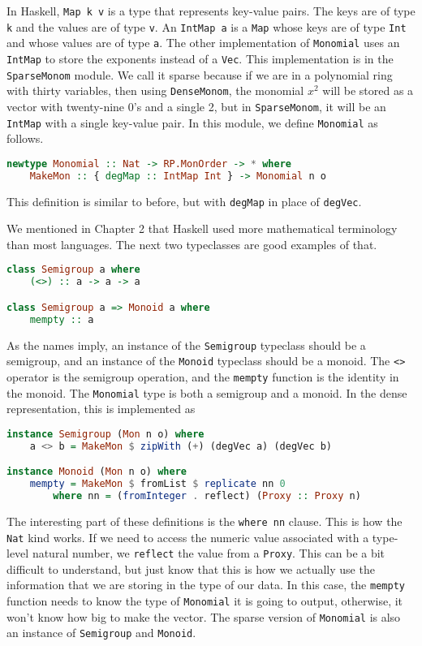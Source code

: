 \documentclass[MS, xcolor=dvipsnames]{wfuthesis}
\theoremstyle{definition}
\begin{document}
In Haskell, \lstinline{Map k v} is a type that represents key-value pairs. The keys are of type \lstinline{k} and the values are of type \lstinline{v}. An \lstinline{IntMap a} is a \lstinline{Map} whose keys are of type \lstinline{Int} and whose values are of type \lstinline{a}. The other implementation of \lstinline{Monomial} uses an \lstinline{IntMap} to store the exponents instead of a \lstinline{Vec}. This implementation is in the \lstinline{SparseMonom} module. We call it sparse because if we are in a polynomial ring with thirty variables, then using \lstinline{DenseMonom}, the monomial $x^2$ will be stored as a vector with twenty-nine 0's and a single 2, but in \lstinline{SparseMonom}, it will be an \lstinline{IntMap} with a single key-value pair. In this module, we define \lstinline{Monomial} as follows.
\begin{lstlisting}[language=Haskell]
newtype Monomial :: Nat -> RP.MonOrder -> * where
    MakeMon :: { degMap :: IntMap Int } -> Monomial n o
\end{lstlisting}
This definition is similar to before, but with \lstinline{degMap} in place of \lstinline{degVec}. \par
We mentioned in Chapter 2 that Haskell used more mathematical terminology than most languages. The next two typeclasses are good examples of that.
\begin{lstlisting}[language=Haskell]
class Semigroup a where
    (<>) :: a -> a -> a

class Semigroup a => Monoid a where
    mempty :: a
\end{lstlisting}
As the names imply, an instance of the \lstinline{Semigroup} typeclass should be a semigroup, and an instance of the \lstinline{Monoid} typeclass should be a monoid. The \lstinline{<>} operator is the semigroup operation, and the \lstinline{mempty} function is the identity in the monoid. The \lstinline{Monomial} type is both a semigroup and a monoid. In the dense representation, this is implemented as
\begin{lstlisting}[language=Haskell]
instance Semigroup (Mon n o) where
    a <> b = MakeMon $ zipWith (+) (degVec a) (degVec b)

instance Monoid (Mon n o) where
    mempty = MakeMon $ fromList $ replicate nn 0
        where nn = (fromInteger . reflect) (Proxy :: Proxy n)
\end{lstlisting}
The interesting part of these definitions is the \lstinline{where nn} clause. This is how the \lstinline{Nat} kind works. If we need to access the numeric value associated with a type-level natural number, we \lstinline{reflect} the value from a \lstinline{Proxy}. This can be a bit difficult to understand, but just know that this is how we actually use the information that we are storing in the type of our data. In this case, the \lstinline{mempty} function needs to know the type of \lstinline{Monomial} it is going to output, otherwise, it won't know how big to make the vector. The sparse version of \lstinline{Monomial} is also an instance of \lstinline{Semigroup} and \lstinline{Monoid}.
\end{document}

